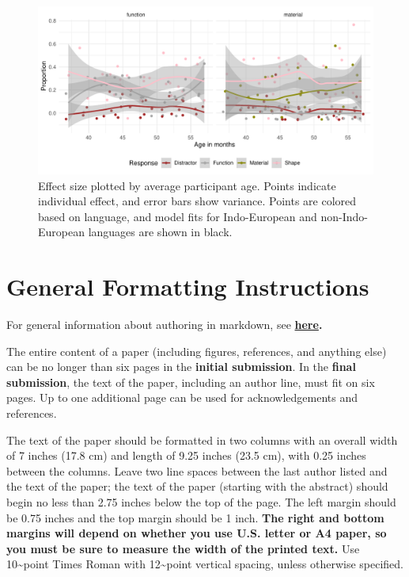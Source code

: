 \documentclass[10pt, letterpaper]{article}
\newenvironment{CodeChunk}{}{}
\begin{document}
\begin{CodeChunk}
\begin{figure}[tb]
\includegraphics[width=1\linewidth]{figs/jitter_function-1} \caption[Effect size plotted by average participant age]{Effect size plotted by average participant age. Points indicate individual effect, and error bars show variance. Points are colored based on language, and model fits for Indo-European and non-Indo-European languages are shown in black.}\label{fig:jitter_function}
\end{figure}
\end{CodeChunk}

\hypertarget{general-formatting-instructions}{%
\section{General Formatting
Instructions}\label{general-formatting-instructions}}

For general information about authoring in markdown, see
\textbf{\href{http://rmarkdown.rstudio.com/authoring_basics.html}{here}.}

The entire content of a paper (including figures, references, and
anything else) can be no longer than six pages in the
\textbf{initial submission}. In the \textbf{final submission}, the text
of the paper, including an author line, must fit on six pages. Up to one
additional page can be used for acknowledgements and references.

The text of the paper should be formatted in two columns with an overall
width of 7 inches (17.8 cm) and length of 9.25 inches (23.5 cm), with
0.25 inches between the columns. Leave two line spaces between the last
author listed and the text of the paper; the text of the paper (starting
with the abstract) should begin no less than 2.75 inches below the top
of the page. The left margin should be 0.75 inches and the top margin
should be 1 inch. \textbf{The right and bottom margins will depend on
whether you use U.S. letter or A4 paper, so you must be sure to
measure the width of the printed text.} Use 10\textasciitilde point
Times Roman with 12\textasciitilde point vertical spacing, unless
otherwise specified.
\end{document}
